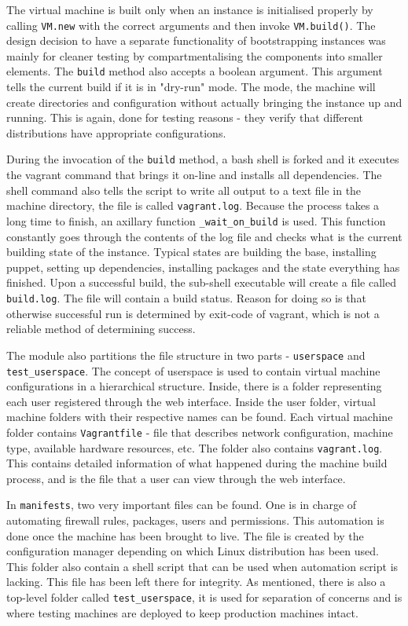 \documentclass{article}
\begin{document}
The virtual machine is built only when an instance is initialised properly by calling \texttt{VM.new} with the correct arguments and then invoke \texttt{VM.build()}. The design decision to have a separate functionality of bootstrapping instances was mainly for cleaner testing by compartmentalising the components into smaller elements. The \texttt{build} method also accepts a boolean argument. This argument tells the current build if it is in "dry-run" mode. The mode, the machine will create directories and configuration without actually bringing the instance up and running. This is again, done for testing reasons - they verify that different \glspl{distribution} have appropriate configurations.

During the invocation of the \texttt{build} method, a \gls{bash} shell is forked and it executes the \gls{vagrant} command that brings it on-line and installs all dependencies. The shell command also tells the script to write all output to a text file in the machine directory, the file is called \texttt{vagrant.log}. Because the process takes a long time to finish, an axillary function \texttt{\_wait\_on\_build} is used. This function constantly goes through the contents of the log file and checks what is the current building state of the instance. Typical states are building the base, installing puppet, setting up dependencies, installing packages and the state everything has finished.
Upon a successful build, the sub-shell executable will create a file called \texttt{build.log}. The file will contain a build status. Reason for doing so is that otherwise successful run is determined by exit-code of vagrant, which is not a reliable method of determining success.

The module also partitions the file structure in two parts - \texttt{userspace} and  \texttt{test\_userspace}. The concept of userspace is used to contain virtual machine configurations in a hierarchical structure. Inside, there is a folder representing each user registered through the web interface. Inside the user folder, virtual machine folders with their respective names can be found. Each virtual machine folder contains \texttt{Vagrantfile} - file that describes network configuration, machine type, available hardware resources, etc. The folder also contains \texttt{vagrant.log}. This contains detailed information of what happened during the machine build process, and is the file that a user can view through the web interface.

In \texttt{manifests}, two very important files can be found. One is in charge of automating firewall rules, packages, users and permissions. This automation is done once the machine has been brought to live. The file is created by the configuration manager depending on which Linux distribution has been used. This folder also contain a shell script that can be used when automation script is lacking. This file has been left there for integrity.
As mentioned, there is also a top-level folder called \texttt{test\_userspace}, it is used for separation of concerns and is where testing machines are deployed to keep production machines intact.
\end{document}
